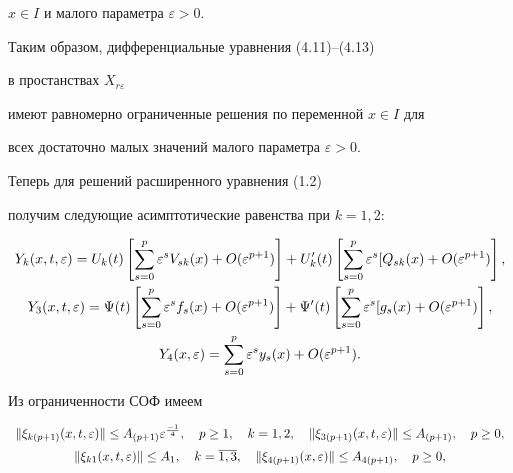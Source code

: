 $x \in I$ и малого параметра $\varepsilon > 0$.


Таким образом, дифференциальные уравнения (4.11)--(4.13)


в простанствах $ X_{r \varepsilon}$


имеют равномерно ограниченные решения по переменной $x \in I$ для


всех достаточно малых значений малого параметра $\varepsilon > 0$.





Теперь для решений расширенного уравнения (1.2)


получим следующие асимптотические равенства при $k =1,2$:


\begin{gather}


Y_k (x, t, \e) = U_k (t)  \left


[\sum \limits_{s = 0}^{p} \varepsilon^s V_{sk} (x) +


O (\e^{p+1})\right] + U_k ' (t)  \left


[\sum \limits_{s = 0}^{p} \varepsilon^s [Q_{sk} (x) +


O (\e^{p+1})\right], \\


Y_3 (x, t, \e) = \Psi (t)  \left


[\sum \limits_{s = 0}^{p} \varepsilon^s f_{s} (x) +


O (\e^{p+1})\right] + \Psi ' (t) 


\left [\sum \limits_{s = 0}^{p} \varepsilon^s [g_{s} (x) +


O (\e^{p+1})\right], \\


Y_4 (x, \e ) = \sum \limits_{s = 0}^{p} \varepsilon^s y_{s} (x) +


O (\e^{p+1}).


\end{gather}





Из ограниченности СОФ имеем


\begin{equation}


\begin{array}{c}


\| \xi_{k(p+1)} (x, t, \e) \| \leq A_{(p+1)} \e^{\frac{-1}{4}}, \quad p\geq 1,


\quad k = 1,2,\quad \| \xi_{3(p+1)} (x, t, \e) \| \leq


A_{(p+1)},\quad p\geq 0,\\[2mm]


\| \xi_{k1} (x, t, \e) \| \leq A_{1}, \quad k = \overline{1,3},


\quad \| \xi_{4(p+1)} (x, \e) \|


\leq A_{4(p+1)},\quad p \geq 0,


\end{array}


\end{equation}



